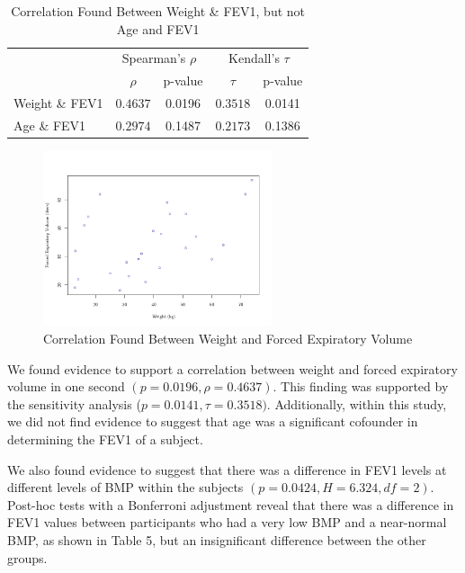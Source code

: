 \documentclass{article}
\begin{document}
		\begin{table}[h]
			\centering
			\footnotesize
			\renewcommand{\arraystretch}{1.2}
			\caption{Correlation Found Between Weight \& FEV1, but not Age and FEV1}
			\begin{tabular}{lcccc}
				\toprule
				& \multicolumn{2}{c}{Spearman’s $\rho$} & \multicolumn{2}{c}{Kendall’s $\tau$} \\
				\cmidrule(lr){2-3} \cmidrule(lr){4-5}
				& $\rho$ & p-value & $\tau$ & p-value \\
				\midrule
				Weight \& FEV1 & $0.4637$ & 0.0196 & $0.3518$ & 0.0141 \\
				Age \& FEV1 & $0.2974$ & 0.1487 & $0.2173$ & 0.1386 \\
				\bottomrule
			\end{tabular}
		\end{table}

		\newpage

		\begin{figure}[h!]
			\centering
			\includegraphics[width=0.6\textwidth]{graph2/ScatterWeightFEV.png}
			\caption{Correlation Found Between Weight and Forced Expiratory Volume}
			\label{fig:histogram}
		\end{figure}


		We found evidence to support a correlation between weight and forced expiratory volume in one second $(p = 0.0196, \rho = 0.4637)$. This finding was supported by the sensitivity analysis ($p = 0.0141, \tau = 0.3518)$. Additionally, within this study, we did not find evidence to suggest that age was a significant cofounder in determining the FEV1 of a subject. 
		
		
		We also found evidence to suggest that there was a difference in FEV1 levels at different levels of BMP within the subjects $(p = 0.0424, H = 6.324, df = 2)$. Post-hoc tests with a Bonferroni adjustment reveal that there was a difference in FEV1 values between participants who had a very low BMP and a near-normal BMP, as shown in Table 5, but an insignificant difference between the other groups.
\end{document}
